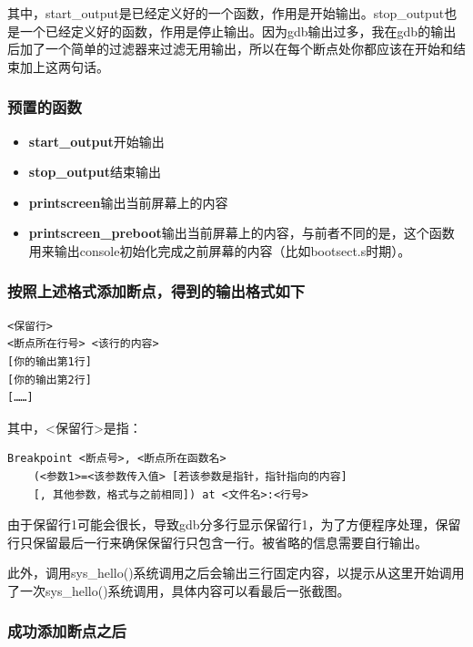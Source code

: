\documentclass[]{report}
\begin{document}
其中，start\_output是已经定义好的一个函数，作用是开始输出。stop\_output也是一个已经定义好的函数，作用是停止输出。因为gdb输出过多，我在gdb的输出后加了一个简单的过滤器来过滤无用输出，所以在每个断点处你都应该在开始和结束加上这两句话。

\subsubsection{预置的函数}

\begin{itemize}
    \item \textbf{start\_output}\quad 开始输出
    \item \textbf{stop\_output}\quad 结束输出
    \item \textbf{printscreen}\quad 输出当前屏幕上的内容
    \item \textbf{printscreen\_preboot}\quad 输出当前屏幕上的内容，与前者不同的是，这个函数用来输出console初始化完成之前屏幕的内容（比如bootsect.s时期）。
\end{itemize}

\subsubsection{按照上述格式添加断点，得到的输出格式如下}

\begin{lstlisting}[caption={输出格式}]
<保留行>
<断点所在行号> <该行的内容>
[你的输出第1行]
[你的输出第2行]
[……]
\end{lstlisting}

其中，<保留行>是指：

\begin{lstlisting}[caption={保留行},morekeywords={Breakpoint,at}]
Breakpoint <断点号>, <断点所在函数名> 
    (<参数1>=<该参数传入值> [若该参数是指针，指针指向的内容]
    [, 其他参数，格式与之前相同]) at <文件名>:<行号>
\end{lstlisting}

由于保留行1可能会很长，导致gdb分多行显示保留行1，为了方便程序处理，保留行只保留最后一行来确保保留行只包含一行。被省略的信息需要自行输出。

此外，调用sys\_hello()系统调用之后会输出三行固定内容，以提示从这里开始调用了一次sys\_hello()系统调用，具体内容可以看最后一张截图。

\subsubsection{成功添加断点之后}
\end{document}
